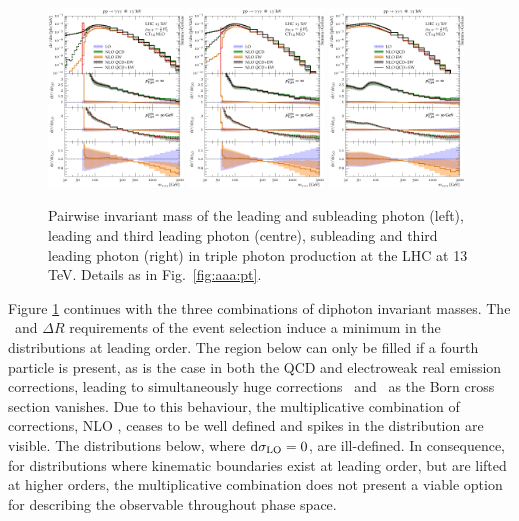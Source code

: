 \begin{figure}[t!]
  \centering
  \includegraphics[width=0.32\textwidth]{figs_aaa/m_y1y2_comb_log}
  \includegraphics[width=0.32\textwidth]{figs_aaa/m_y1y3_comb_log}
  \includegraphics[width=0.32\textwidth]{figs_aaa/m_y2y3_comb_log}
  \caption{
    Pairwise invariant mass of the leading and subleading photon (left),
    leading and third leading photon (centre), subleading and third leading 
    photon (right) 
    in triple photon production at the LHC at 13\,TeV. 
    Details as in Fig.\ \ref{fig:aaa:pt}.
    \label{fig:aaa:myy}
  }
\end{figure}

Figure \ref{fig:aaa:myy} continues with the three combinations of 
diphoton invariant masses. 
The \pT\ and $\Delta R$ requirements 
of the event selection induce a minimum in the distributions 
at leading order. 
The region below can only be filled if a fourth particle is 
present, as is the case in both the QCD and electroweak real 
emission corrections, leading to simultaneously huge 
corrections \deltaQCD\ and \deltaEW\ as the Born cross 
section vanishes. 
Due to this behaviour, the multiplicative combination of 
corrections, NLO \QCDtEW, ceases to be well defined and 
spikes in the distribution are visible.
The distributions below, where $\mathrm{d}\sigma_\text{LO}=0$, 
are ill-defined. 
In consequence, for distributions where kinematic boundaries 
exist at leading order, but are lifted at higher orders, 
the multiplicative combination does not present a viable 
option for describing the observable 
throughout phase space. 

